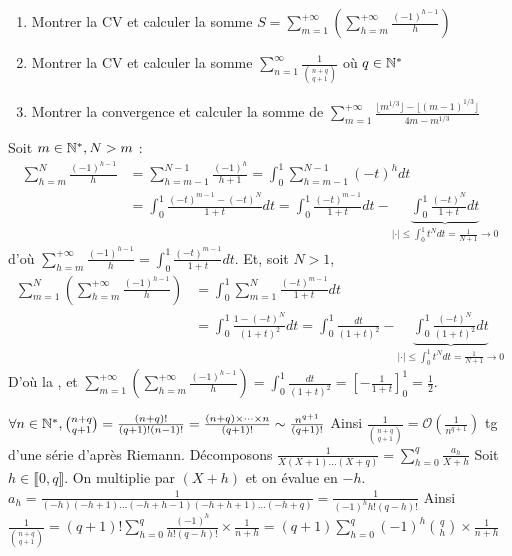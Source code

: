 
\begin{statementbox}
\begin{enumerate}
  \item[a.] Montrer la CV et calculer la somme $S = \sum_{m=1}^{+\infty} \left( \sum_{h=m}^{+\infty} \frac{(-1)^{h-1}}{h} \right)$
  \item[j.] Montrer la CV et calculer la somme $\sum_{n=1}^\infty \frac{1}{\binom{n+q}{q+1}}$ où $q \in \mathbb N^*$
  \item[2.] Montrer la convergence et calculer la somme de $\sum_{m=1}^{+\infty} \frac{\lfloor m^{1/3} \rfloor - \lfloor (m-1)^{1/3} \rfloor}{4m - m^{1/3}}$
\end{enumerate}
\end{statementbox}

\begin{solution}
Soit $m \in \mathbb N^*, N > m$ :
\begin{align*}
\sum_{h=m}^N \frac{(-1)^{h-1}}{h} &= \sum_{h=m-1}^{N-1} \frac{(-1)^h}{h+1} = \int_0^1 \sum_{h=m-1}^{N-1} (-t)^h dt \\
&= \int_0^1 \frac{(-t)^{m-1} - (-t)^N}{1+t} dt = \int_0^1 \frac{(-t)^{m-1}}{1+t} dt - \underbrace{\int_0^1 \frac{(-t)^N}{1+t} dt}_{|\cdot| \leq \int_0^1 t^N dt = \frac{1}{N+1} \to 0}
\end{align*}
d'où $\sum_{h=m}^{+\infty} \frac{(-1)^{h-1}}{h} = \int_0^1 \frac{(-t)^{m-1}}{1+t} dt$.
Et, soit $N > 1$,
\begin{align*}
\sum_{m=1}^N \left( \sum_{h=m}^{+\infty} \frac{(-1)^{h-1}}{h} \right) &= \int_0^1 \sum_{m=1}^N \frac{(-t)^{m-1}}{1+t} dt \\
&= \int_0^1 \frac{1 - (-t)^N}{(1+t)^2} dt = \int_0^1 \frac{dt}{(1+t)^2} - \underbrace{\int_0^1 \frac{(-t)^N}{(1+t)^2} dt}_{|\cdot| \leq \int_0^1 t^N dt = \frac{1}{N+1} \to 0}
\end{align*}
D'où la , et $\sum_{m=1}^{+\infty} \left( \sum_{h=m}^{+\infty} \frac{(-1)^{h-1}}{h} \right) = \int_0^1 \frac{dt}{(1+t)^2} = \left[ -\frac{1}{1+t} \right]_0^1 = \boxed{\frac{1}{2}}$.

$\forall n \in \mathbb N^*, \binom{n+q}{q+1} = \frac{(n+q)!}{(q+1)!(n-1)!} = \frac{(n+q) \times \dots \times n}{(q+1)!} \sim \frac{n^{q+1}}{(q+1)!}$
Ainsi $\frac{1}{\binom{n+q}{q+1}} = \mathcal{O}\left(\frac{1}{n^{q+1}}\right)$ tg d'une série  d'après Riemann.
Décomposons $\frac{1}{X(X+1)\dots(X+q)} = \sum_{h=0}^q \frac{a_h}{X+h}$
Soit $h \in \llbracket 0, q \rrbracket$. On multiplie par $(X+h)$ et on évalue en $-h$.
$a_h = \frac{1}{(-h)(-h+1)\dots(-h+h-1)(-h+h+1)\dots(-h+q)} = \frac{1}{(-1)^h h! (q-h)!}$
Ainsi $\frac{1}{\binom{n+q}{q+1}} = (q+1)! \sum_{h=0}^q \frac{(-1)^h}{h!(q-h)!} \times \frac{1}{n+h} = (q+1) \sum_{h=0}^q (-1)^h \binom{q}{h} \times \frac{1}{n+h}$


\end{solution}
